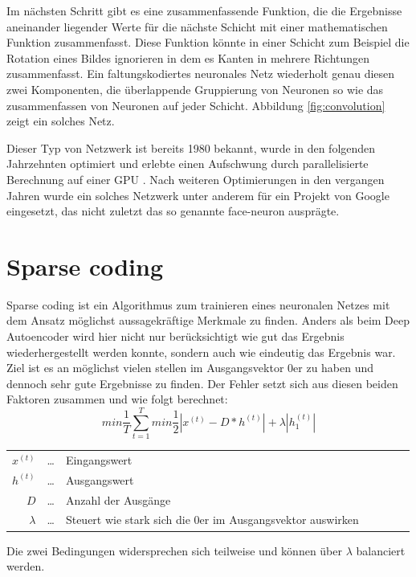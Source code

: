 Im nächsten Schritt gibt es eine zusammenfassende Funktion, die die Ergebnisse aneinander liegender Werte für die nächste Schicht mit einer mathematischen Funktion zusammenfasst. Diese Funktion könnte in einer Schicht zum Beispiel die Rotation eines Bildes ignorieren in dem es Kanten in mehrere Richtungen zusammenfasst. Ein faltungskodiertes neuronales Netz wiederholt genau diesen zwei Komponenten, die überlappende Gruppierung von Neuronen so wie das zusammenfassen von Neuronen auf jeder Schicht. Abbildung \ref{fig:convolution} zeigt ein solches Netz.

Dieser Typ von Netzwerk ist bereits 1980  bekannt, wurde in den folgenden Jahrzehnten optimiert und erlebte einen Aufschwung durch parallelisierte Berechnung auf einer GPU . Nach weiteren Optimierungen in den vergangen Jahren wurde ein solches Netzwerk unter anderem für ein Projekt von Google  eingesetzt, das nicht zuletzt das so genannte face-neuron ausprägte.

\section{Sparse coding}

Sparse coding ist ein Algorithmus zum trainieren eines neuronalen Netzes mit dem Ansatz möglichst aussagekräftige Merkmale zu finden. Anders als beim Deep Autoencoder wird hier nicht nur berücksichtigt wie gut das Ergebnis wiederhergestellt werden konnte, sondern auch wie eindeutig das Ergebnis war. Ziel ist es an möglichst vielen stellen im Ausgangsvektor 0er zu haben und dennoch sehr gute Ergebnisse zu finden. Der Fehler setzt sich aus diesen beiden Faktoren zusammen und wie folgt berechnet:
$$min\frac{1}{T}\sum_{t=1}^{T}min\frac{1}{2}|x^{(t)}-D*h^{(t)}|+\lambda|h^{(t)}_1|$$
\begin{center}\begin{tabular}{rclcrcl}
	$x^{(t)}$ & \dots & Eingangswert\\
	$h^{(t)}$ & \dots & Ausgangswert\\
	$D$ & \dots & Anzahl der Ausgänge\\
	$\lambda$ & \dots & Steuert wie stark sich die 0er im Ausgangsvektor auswirken\\ 
\end{tabular}\end{center}
Die zwei Bedingungen widersprechen sich teilweise und können über $\lambda$ balanciert werden.